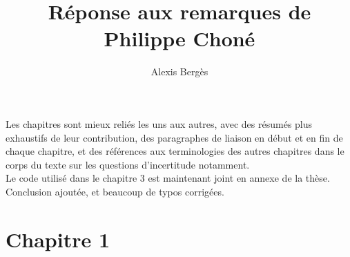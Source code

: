 \documentclass{article}
\begin{document}
\title{Réponse aux remarques de Philippe Choné}
\author{Alexis Bergès}

\maketitle

Les chapitres sont mieux reliés les uns aux autres, avec des résumés plus exhaustifs de leur contribution, des paragraphes de liaison en début et en fin de chaque chapitre, et des références aux terminologies des autres chapitres dans le corps du texte sur les questions d'incertitude notamment.\\

Le code utilisé dans le chapitre 3 est maintenant joint en annexe de la thèse.\\

Conclusion ajoutée, et beaucoup de typos corrigées.\\

\section{Chapitre 1}
\end{document}
